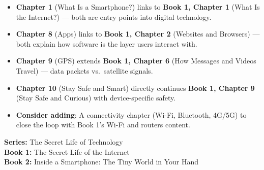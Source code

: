 \begin{tcolorbox}[enhanced,colback=TechPurple!5,colframe=TechPurple!50,arc=6pt,boxrule=1pt,
  left=10pt,right=10pt,top=10pt,bottom=10pt]
\begin{itemize}
  \item \textbf{Chapter 1} (What Is a Smartphone?) links to \textbf{Book 1, Chapter 1} (What Is the Internet?) — both are entry points into digital technology.
  \item \textbf{Chapter 8} (Apps) links to \textbf{Book 1, Chapter 2} (Websites and Browsers) — both explain how software is the layer users interact with.
  \item \textbf{Chapter 9} (GPS) extends \textbf{Book 1, Chapter 6} (How Messages and Videos Travel) — data packets vs.\ satellite signals.
  \item \textbf{Chapter 10} (Stay Safe and Smart) directly continues \textbf{Book 1, Chapter 9} (Stay Safe and Curious) with device-specific safety.
  \item \textbf{Consider adding}: A connectivity chapter (Wi-Fi, Bluetooth, 4G/5G) to close the loop with Book 1's Wi-Fi and routers content.
\end{itemize}
\end{tcolorbox}

\vspace{12pt}

\begin{tcolorbox}[enhanced,colback=LightGray,colframe=TechPurple!40,arc=6pt,boxrule=0.8pt,
  left=10pt,right=10pt,top=8pt,bottom=8pt]
\textbf{Series:} The Secret Life of Technology\\
\textbf{Book 1:} The Secret Life of the Internet \checkmark\\
\textbf{Book 2:} Inside a Smartphone: The Tiny World in Your Hand \checkmark
\end{tcolorbox}
